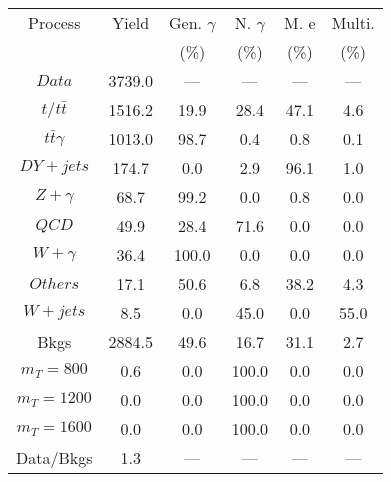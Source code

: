 \begin{figure}
\begin{minipage}[c]{0.32\textwidth}
\tiny{
\begin{tabular}{cccccc}
\hline
Process & Yield & Gen. $\gamma$ & N. $\gamma$ & M. e & Multi. \\
 &  & (\%) & (\%) & (\%) & (\%)  \\
\hline
                                                                      $ Data $ &  3739.0 &  --- &  --- &  --- &  ---\\
$ t/t\bar{t} $ &  1516.2 &  19.9 &  28.4 &  47.1 &  4.6\\
$ t\bar{t}\gamma $ &  1013.0 &  98.7 &  0.4 &  0.8 &  0.1\\
$ DY+jets $ &  174.7 &  0.0 &  2.9 &  96.1 &  1.0\\
$ Z+\gamma $ &  68.7 &  99.2 &  0.0 &  0.8 &  0.0\\
$ QCD $ &  49.9 &  28.4 &  71.6 &  0.0 &  0.0\\
$ W+\gamma $ &  36.4 &  100.0 &  0.0 &  0.0 &  0.0\\
$ Others $ &  17.1 &  50.6 &  6.8 &  38.2 &  4.3\\
$ W+jets $ &  8.5 &  0.0 &  45.0 &  0.0 &  55.0\\
Bkgs &  2884.5 &  49.6 &  16.7 &  31.1 &  2.7\\
$ m_{T} = 800 $ &  0.6 &  0.0 &  100.0 &  0.0 &  0.0\\
$ m_{T} = 1200 $ &  0.0 &  0.0 &  100.0 &  0.0 &  0.0\\
$ m_{T} = 1600 $ &  0.0 &  0.0 &  100.0 &  0.0 &  0.0\\
Data/Bkgs &  1.3 &  --- &  --- &  --- &  ---\\
\hline
\end{tabular}
}
\end{minipage}
\end{figure}


